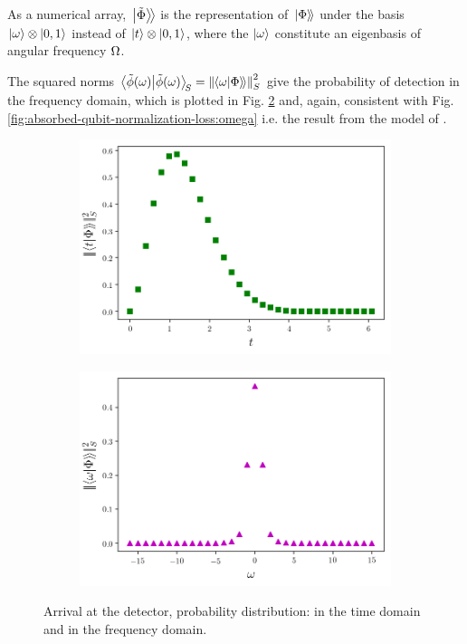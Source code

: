 As a numerical array, $\left.\left| \tilde{\Phi} \right\rangle\!\right\rangle$ is the representation of $\left.\left| \Phi \right\rangle\!\right\rangle$
under the basis $\ket{\omega} \otimes \ket{0,1}$ instead of $\ket{t} \otimes \ket{0,1}$,
where the $\ket{\omega}$ constitute an eigenbasis of angular frequency ${\Omega}$.

\citereset
The squared norms $\braket{\tilde{\phi}(\omega)}_{\!S} = \norm{\!\left.\left\langle \omega \middle| \Phi \right\rangle\!\right\rangle}_S^2$
give the probability of detection in the frequency domain, which is plotted in
Fig. \ref{fig:2l_pw_detect_prob_omega} and, again, consistent
with Fig. \ref{fig:absorbed-qubit-normalization-loss:omega} i.e.
the result from the model of \cite{RuschhauptAbsorption}.

\begin{figure}
  \centering
  \begin{subfigure}[b]{0.49\textwidth}
    \includegraphics[width=\linewidth]{img/2ldetect/pw-detect-prob.png}
    \subcaption{}\label{fig:2l_pw_detect_prob_t}
  \end{subfigure}
  \begin{subfigure}[b]{0.49\textwidth}
    \includegraphics[width=\linewidth]{img/2ldetect/pw-detect-prob-ft.png}
    \subcaption{}\label{fig:2l_pw_detect_prob_omega}
  \end{subfigure}
  \caption[
    Arrival at the detector, probability distribution.
  ]{
    Arrival at the detector, probability distribution:
     in the time domain
    and  in the frequency domain.
  }
  \label{fig:2l_pw_detect_prob}
\end{figure}

